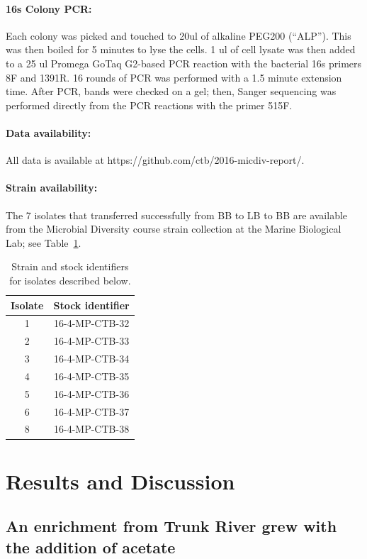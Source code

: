 \documentclass{article}
\begin{document}
\paragraph{16s Colony PCR:} Each colony was picked and touched to 20ul of
alkaline PEG200 (``ALP'').  This was then boiled for 5 minutes to lyse
the cells. 1 ul of cell lysate was then added to a 25 ul Promega GoTaq
G2-based PCR reaction with the bacterial 16s primers 8F and 1391R.  16
rounds of PCR was performed with a 1.5 minute extension time.  After
PCR, bands were checked on a gel; then,
Sanger sequencing was performed directly from the PCR reactions with
the primer 515F.

\paragraph{Data availability:}
All data is available at https://github.com/ctb/2016-micdiv-report/.

\paragraph{Strain availability:} The 7 isolates that transferred
successfully from BB to LB to BB are available from the Microbial Diversity
course strain collection at the Marine Biological Lab; see Table~\ref{tab:isolates}.

\begin{table}
\centering
\begin{tabular}{|c|c|}
\hline
Isolate & Stock identifier \\
\hline
1 & 16-4-MP-CTB-32 \\
2 & 16-4-MP-CTB-33 \\
3 & 16-4-MP-CTB-34 \\
4 & 16-4-MP-CTB-35 \\
5 & 16-4-MP-CTB-36 \\
6 & 16-4-MP-CTB-37 \\
8 & 16-4-MP-CTB-38 \\
\hline
\end{tabular}
\caption{Strain and stock identifiers for isolates described below.}
\label{tab:isolates}
\end{table}

\section*{Results and Discussion}

\subsection*{An enrichment from Trunk River grew with the addition of acetate}
\end{document}

